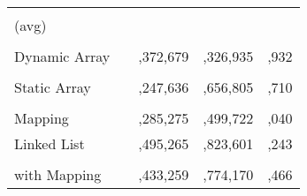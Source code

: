 




\begin{table}[t]
\setlength{\tabcolsep}{0.1\tabcolsep}%
\centering
\begin{tabular} {|>{\centering}m{2.5cm} |>{\centering}m{0.5cm} |>{\centering}m{1.5cm} |>{\centering}m{1.8cm} |>{\centering\arraybackslash}m{1.5cm}|}

\multicolumn{1}{c}{} & 

\headrow{\footnotesize Max Trades (w.c.)} & 
\headrow{\footnotesize Gas for Max Trades} & 
\headrow{\footnotesize Gas for 1000 Trades} & 
\headrow{\footnotesize \shortstack{ Gas for Submission \\ (avg)}} \\ \hline

\shortstack{Heap with \\ Dynamic Array}       & 38            & 5,372,679                   	& 457,326,935      & 207,932     \\ \hline
\shortstack{Heap with \\ Static Array}         	& 42            & 5,247,636                  	& 333,656,805         & 197,710         \\ \hline
\shortstack{Heap with \\ Mapping} 		& 46           	 & 5,285,275                     & 226,499,722    & 215,040           \\ \hline
Linked List                     	& 152            & 5,495,265                     & 35,823,601         & 735,243             \\ \hline
\shortstack{Linked List \\ with Mapping}     	& 86             & 5,433,259                     & 62,774,170        &  547,466              \\ \hline


\end{tabular}
\end{table}

